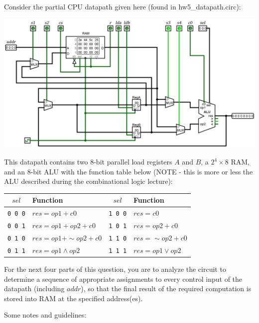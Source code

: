 \item[16] Consider the partial CPU datapath given here (found in hw5\_datapath.circ):

\includegraphics[width=15.5cm]{images/datapath_ex.png}

This datapath contains two 8-bit parallel load registers $A$ and $B$, a $2^4 \times 8$ RAM, and an 8-bit ALU with the function table below (NOTE - this is more or less the ALU described during the combinational logic lecture):

\begin{tabular}{c | l | c | l}
$sel$ & Function & $sel$ & Function \\
\hline
{\tt 0 0 0} & $res = op1 + c0$ & {\tt 1 0 0} & $res = c0$ \\
{\tt 0 0 1} & $res = op1 + op2 + c0$ & {\tt 1 0 1} & $res = op2 + c0$ \\
{\tt 0 1 0} & $res = op1 + \sim op2 + c0$ & {\tt 1 1 0} & $res = \sim op2 + c0$ \\
{\tt 0 1 1} & $res = op1 \land op2$ & {\tt 1 1 1} & $res = op1 \lor op2$ \\
\end{tabular}

For the next four parts of this question, you are to analyze the circuit to determine a sequence of appropriate assignments to every control input of the datapath (including $addr$), so that the final result of the required computation is stored into RAM at the specified address(es).

Some notes and guidelines:

